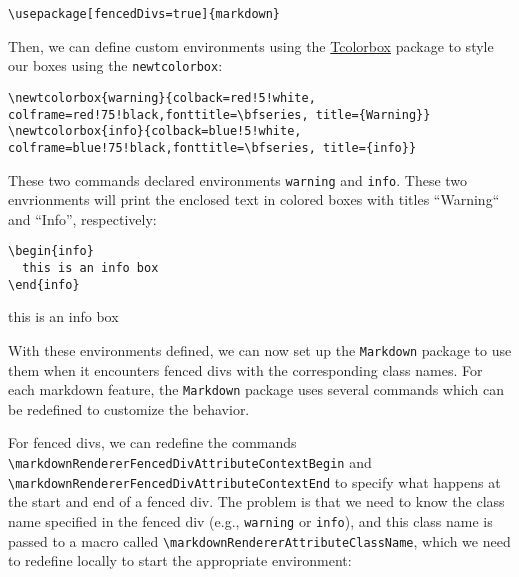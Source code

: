 \documentclass[]{article}
\def\fenceddivclass#1{
  \begin{#1}
  \def\endfence{\end{#1}}
}
\def\markdownRendererFencedDivAttributeContextBegin{
  \begingroup
  \let\markdownRendererAttributeClassName\fenceddivclass
  \def\endfence{}
}
\def\markdownRendererFencedDivAttributeContextEnd{\endfence\endgroup}
\begin{document}
\begin{verbatim}
\usepackage[fencedDivs=true]{markdown}
\end{verbatim}

Then, we can define custom environments using the \href{https://ctan.org/pkg/tcolorbox?lang=en}{Tcolorbox} package to style our boxes using the \Verb|newtcolorbox|:

\begin{verbatim}
\newtcolorbox{warning}{colback=red!5!white, colframe=red!75!black,fonttitle=\bfseries, title={Warning}}
\newtcolorbox{info}{colback=blue!5!white, colframe=blue!75!black,fonttitle=\bfseries, title={info}}
\end{verbatim}

These two commands declared environments \texttt{warning} and \texttt{info}. These two envrionments will print the enclosed text
in colored boxes with titles ``Warning`` and ``Info'', respectively:

\begin{verbatim}
\begin{info}
  this is an info box
\end{info}
\end{verbatim}

\begin{info}
  this is an info box
\end{info}


With these environments defined, we can now set up the \texttt{Markdown}
package to use them when it encounters fenced divs with the corresponding class
names. For each markdown feature, the \texttt{Markdown} package uses several commands
which can be redefined to customize the behavior. 

For fenced divs, we can redefine
the commands \Verb|\markdownRendererFencedDivAttributeContextBegin| and
\Verb|\markdownRendererFencedDivAttributeContextEnd| to specify what happens at the start and end of a fenced div.
The problem is that we need to know the class name specified in the fenced div (e.g., \texttt{warning} or \texttt{info}),
and this class name is passed to a macro called \Verb|\markdownRendererAttributeClassName|, which we need to redefine 
locally to start the appropriate environment:
\end{document}
